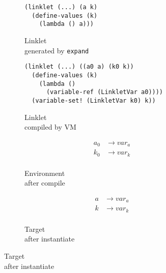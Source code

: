 \begin{figure}[h!]
  \small
  \begin{subfigure}[b]{0.25\textwidth}
    \begin{mdframed}
\begin{verbatim}
(linklet (...) (a k)
  (define-values (k)
    (lambda () a)))
\end{verbatim}
    \end{mdframed}
    \caption{Linklet \\ generated by \texttt{expand}}
    \label{fig:1}
  \end{subfigure}
  \begin{subfigure}[b]{0.38\textwidth}
    \begin{mdframed}
\begin{verbatim}
(linklet (...) ((a0 a) (k0 k))
  (define-values (k)
    (lambda ()
      (variable-ref (LinkletVar a0))))
  (variable-set! (LinkletVar k0) k))
\end{verbatim}
    \end{mdframed}
    \caption{Linklet \\ compiled by VM}
    \label{fig:2}
  \end{subfigure} \hfill
  \begin{subfigure}[b]{0.15\textwidth}
    \begin{mdframed}
      \begin{align*}
        a_0 &\rightarrow var_a \\
        k_0 &\rightarrow var_k \\
      \end{align*}
    \end{mdframed}
    \caption{Environment \\ after compile}
    \label{fig:2}
  \end{subfigure}
  \begin{subfigure}[b]{0.15\textwidth}
    \begin{mdframed}
      \begin{align*}
        a &\rightarrow var_a \\
        k &\rightarrow var_k \\
      \end{align*}
    \end{mdframed}
    \caption{Target \\ after instantiate}
    \label{fig:2}
  \end{subfigure}
\end{figure}

